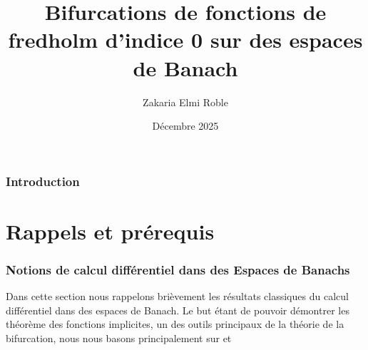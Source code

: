 \documentclass[a4paper,12pt,oneside,titlepage]{article}
\title{Bifurcations de fonctions de fredholm d'indice 0 sur des espaces de Banach}
\author{Zakaria Elmi Roble }
\date{Décembre 2025}
\theoremstyle{definition}
\theoremstyle{plain}
\begin{document}
\maketitle
\tableofcontents
\newpage
\section*{Introduction}
\newpage
\part{Rappels et prérequis}

\section{Notions de calcul différentiel dans des Espaces de Banachs}

Dans cette section nous rappelons brièvement les résultats classiques du calcul différentiel dans des espaces de Banach. Le but étant de pouvoir démontrer les théorème des fonctions implicites, un des outils principaux de la théorie de la bifurcation, nous nous basons principalement sur \cite{dieudonne1969fma8} et \cite{coleman2012calculus}
\end{document}
